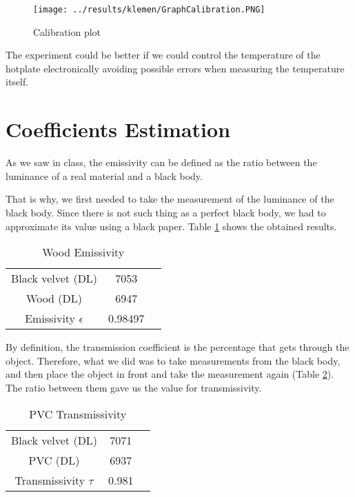 \documentclass{article}
\begin{document}
\begin{figure}[H]
\centering
\begin{minipage}[b]{0.8\linewidth}
\texttt{[image: ../results/klemen/GraphCalibration.PNG]}
\end{minipage}
\caption{Calibration plot}
\label{fig:calib}
\end{figure}
The experiment could be better if we could control the  
temperature of the hotplate electronically avoiding possible errors
when measuring the temperature itself.

\section{Coefficients Estimation}
As we saw in class, the emissivity 
can be defined as the ratio between the luminance of a real material and a black body.

That is why, we first needed to take the measurement of the luminance of the black body.
Since there is not such thing as a perfect black body, we had
to approximate its value using a black paper. Table \ref{tb:tb2a} shows
the obtained results.

\begin{table}[H]
\centering
\begin{tabular}{|c|c|c|}
\hline
Black velvet (DL) & 7053 \\
Wood (DL) & 6947\\
\hline
Emissivity $\epsilon$ & 0.98497\\ 
\hline
\end{tabular}
\caption{Wood Emissivity}
\label{tb:tb2a}
\end{table} 

By definition, the transmission coefficient is the percentage 
that gets through the object. Therefore, what we did was to take measurements
from the black body, and then place the object in front and take the measurement
again (Table \ref{tb:tb2b}). The ratio between them gave us the value for
transmissivity.

\begin{table}[H]
\centering
\begin{tabular}{|c|c|c|}
\hline
Black velvet (DL)& 7071 \\
PVC (DL) & 6937\\
\hline
Transmissivity $\tau$ & 0.981 \\ 
\hline
\end{tabular}
\caption{PVC Transmissivity}
\label{tb:tb2b}
\end{table} 
\end{document}
